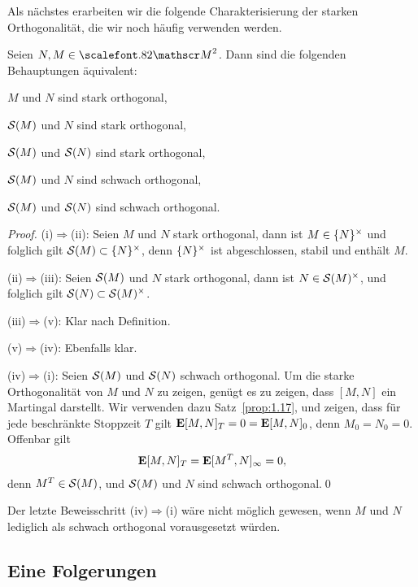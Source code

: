 Als nächstes erarbeiten wir die folgende Charakterisierung der
starken Orthogonalität, die wir noch häufig verwenden werden.

\begin{lemma}
\label{lem:5.2}
Seien $N,M \in \MM^2$. Dann sind die folgenden Behauptungen äquivalent:
\begin{equivenum}
\item $M$ und $N$ sind stark orthogonal,
\item $\mathcal{S}(M)$ und $N$ sind stark orthogonal,
\item $\mathcal{S}(M)$ und $\mathcal{S}(N)$ sind stark orthogonal,
\item $\mathcal{S}(M)$ und $N$ sind schwach orthogonal,
\item $\mathcal{S}(M)$ und $\mathcal{S}(N)$ sind schwach orthogonal.\fish
\end{equivenum}
\end{lemma}
\begin{proof}
(i)$\Rightarrow$(ii): Seien $M$ und $N$ stark orthogonal, dann ist
$M\in\{N\}^\times$ und folglich gilt $\mathcal{S}(M)\subset \{N\}^\times$, denn
$\{N\}^\times$ ist abgeschlossen, stabil und enthält $M$.

(ii)$\Rightarrow$(iii): Seien $\mathcal{S}(M)$ und $N$ stark orthogonal, dann ist
$N\in \mathcal{S}(M)^\times$, und folglich gilt $\mathcal{S}(N)\subset \mathcal{S}(M)^\times$.

(iii)$\Rightarrow$(v): Klar nach Definition.

(v)$\Rightarrow$(iv): Ebenfalls klar.

(iv)$\Rightarrow$(i): Seien $\mathcal{S}(M)$ und $\mathcal{S}(N)$ schwach orthogonal. Um die
starke Orthogonalität von $M$ und $N$ zu zeigen, genügt es zu zeigen, dass
$[M,N]$ ein Martingal darstellt. Wir verwenden dazu Satz~\ref{prop:1.17}, und
zeigen, dass für jede beschränkte Stoppzeit $T$ gilt $\mathbf{E}[M,N]_T = 0 =
\mathbf{E}[M,N]_0$, denn $M_0 = N_0 = 0$. Offenbar gilt
\begin{align*}
\mathbf{E}[M,N]_T = \mathbf{E}[M^T,N]_\infty = 0,
\end{align*}
denn $M^T\in\mathcal{S}(M)$, und $\mathcal{S}(M)$ und $N$ sind schwach orthogonal.\qed
\end{proof}

\begin{rem*}
Der letzte Beweisschritt (iv)$\Rightarrow$(i) wäre nicht möglich gewesen, wenn
$M$ und $N$ lediglich als schwach orthogonal vorausgesetzt würden.\map 
\end{rem*}

\subsection{Eine Folgerungen}

